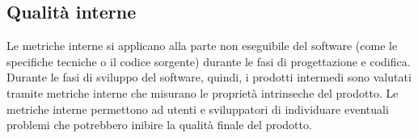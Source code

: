 \subsection{Qualità interne}
Le metriche interne si applicano alla parte non eseguibile del software (come le specifiche tecniche o il codice sorgente) durante le fasi di progettazione e codifica. Durante le fasi di sviluppo del software, quindi, i prodotti intermedi sono valutati tramite metriche interne che misurano le proprietà intrinseche del prodotto. 
Le metriche interne permettono ad utenti e sviluppatori di individuare eventuali problemi che potrebbero inibire la qualità finale del prodotto.